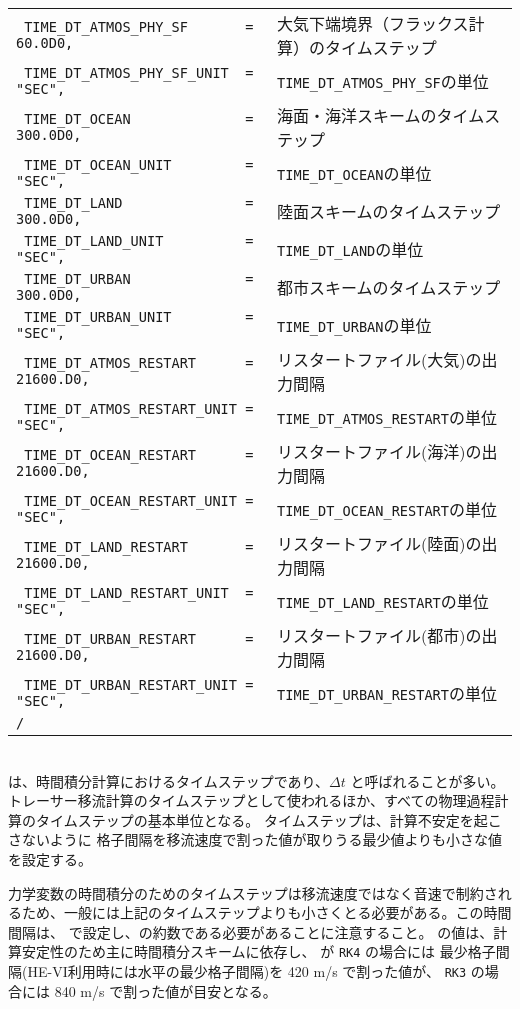 {{{\begin{tabularx}{140mm}{lX}
\verb| TIME_DT_ATMOS_PHY_SF       = 60.0D0, | & 大気下端境界（フラックス計算）のタイムステップ\\
\verb| TIME_DT_ATMOS_PHY_SF_UNIT  = "SEC",  | & \verb|TIME_DT_ATMOS_PHY_SF|の単位\\
\verb| TIME_DT_OCEAN              = 300.0D0,| & 海面・海洋スキームのタイムステップ\\
\verb| TIME_DT_OCEAN_UNIT         = "SEC",  | & \verb|TIME_DT_OCEAN|の単位\\
\verb| TIME_DT_LAND               = 300.0D0,| & 陸面スキームのタイムステップ\\
\verb| TIME_DT_LAND_UNIT          = "SEC",  | & \verb|TIME_DT_LAND|の単位\\
\verb| TIME_DT_URBAN              = 300.0D0,| & 都市スキームのタイムステップ\\
\verb| TIME_DT_URBAN_UNIT         = "SEC",  | & \verb|TIME_DT_URBAN|の単位\\
\verb| TIME_DT_ATMOS_RESTART      = 21600.D0, | & リスタートファイル(大気)の出力間隔\\
\verb| TIME_DT_ATMOS_RESTART_UNIT = "SEC",    | & \verb|TIME_DT_ATMOS_RESTART|の単位\\
\verb| TIME_DT_OCEAN_RESTART      = 21600.D0, | & リスタートファイル(海洋)の出力間隔\\
\verb| TIME_DT_OCEAN_RESTART_UNIT = "SEC",    | & \verb|TIME_DT_OCEAN_RESTART|の単位\\
\verb| TIME_DT_LAND_RESTART       = 21600.D0, | & リスタートファイル(陸面)の出力間隔\\
\verb| TIME_DT_LAND_RESTART_UNIT  = "SEC",    | & \verb|TIME_DT_LAND_RESTART|の単位\\
\verb| TIME_DT_URBAN_RESTART      = 21600.D0, | & リスタートファイル(都市)の出力間隔\\
\verb| TIME_DT_URBAN_RESTART_UNIT = "SEC",    | & \verb|TIME_DT_URBAN_RESTART|の単位\\
\verb|/|\\
\end{tabularx}
}}}\\


 は、時間積分計算におけるタイムステップであり、$\Delta t$ と呼ばれることが多い。
トレーサー移流計算のタイムステップとして使われるほか、すべての物理過程計算のタイムステップの基本単位となる。
タイムステップは、計算不安定を起こさないように
格子間隔を移流速度で割った値が取りうる最少値よりも小さな値を設定する。

力学変数の時間積分のためのタイムステップは移流速度ではなく音速で制約されるため、一般には上記のタイムステップよりも小さくとる必要がある。この時間間隔は、 で設定し、の約数である必要があることに注意すること。
の値は、計算安定性のため主に時間積分スキームに依存し、
 が \verb|RK4| の場合には
最少格子間隔(HE-VI利用時には水平の最少格子間隔)を 420 m/s で割った値が、
\verb|RK3| の場合には 840 m/s で割った値が目安となる。


